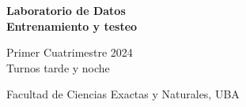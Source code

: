 \documentclass[aspectratio=169,12pt]{beamer}
\begin{document}

\begin{frame}

 \begin{center}

\Large\textbf{Laboratorio de Datos} \\
\large\textbf{Entrenamiento y testeo}




\vspace{1cm}
Primer Cuatrimestre 2024 \\ Turnos tarde y noche

\vspace{1cm}


 {\small Facultad de Ciencias Exactas y Naturales, UBA}
 \end{center}


\end{frame}

\end{document}
